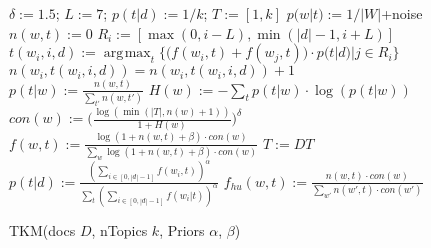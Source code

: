 \documentclass[twocolumn,10]{article}
\DeclareMathOperator*{\argmax}{\arg\!\max}
\begin{document}
\begin{figure*}
\begin{minipage}[b]{0.6\textwidth}
			\begin{algorithm}[H]
				\caption{TKM(\small{docs $D$, nTopics $k$, Priors $\alpha$, $\beta$})}  \label{alg:TKM}
				\begin{algorithmic}[1]
					\begin{small}
						\STATE $\delta:=1.5$; $L:=7$; $p(t|d):= 1/k$; $T:=[1,k]$
						\STATE $p(w|t):= 1/|W|$+noise %
						\STATE $ n(w,t):=0$  %
						\STATE $R_i:=[\max(0,i-L),\min(|d|-1,i+L)]$%
						\STATE $t(w_i,i,d):=\argmax_t\{\big( f(w_i,t)+f(w_j,t)\big)\cdot p(t|d)| j \in R_i\}$
						\STATE $n(w_i,t(w_i,i,d))=n(w_i,t(w_i,i,d))+1$ 
						\ENDFOR
						\ENDFOR
						\STATE $p(t|w):=\frac{n(w,t)}{\sum_{t'} n(w,t')}$ 
						\STATE $H(w):=-\sum_t p(t|w)\cdot \log(p(t|w))$%
						\STATE $con(w):=\big(\frac{\log(\min(|T|,n(w)+1))}{1+H(w)}\big)^{\delta}$
						\STATE $f(w,t):= \frac{\log(1+n(w,t)+\beta)\cdot con(w)}{\sum_w \log(1+n(w,t)+\beta)\cdot con(w)}$
						\STATE $T:=DT$ 			
						\STATE $p(t|d) := \frac{(\sum_{i \in [0,|d|-1]} f(w_i,t))^{\alpha}}{\sum_t (\sum_{i \in [0,|d|-1]} f(w_i|t))^{\alpha}}$
						\vspace{-3pt}
						\ENDWHILE
						\vspace{-2pt}						
						\STATE $f_{hu}(w,t):= \frac{n(w,t)\cdot con(w)}{\sum_{w'} n(w',t)\cdot con(w')}$
						\vspace{-2pt}							
					\end{small}
				\end{algorithmic}			
			\end{algorithm}
			\vspace{-4pt}				
		\end{minipage}	
				\vspace{-6pt}				
	\end{figure*}
		
\end{document}
